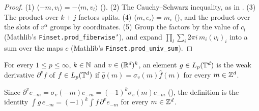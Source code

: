 \begin{proof}
\leanok
(1) $\langle -m, v_l \rangle = -\langle m, v_l \rangle$ (). (2) The
Cauchy--Schwarz inequality, as in . (3) The product over $k + j$
factors splits. (4) $\langle m, e_i \rangle = m_i$ (), and the product over
the slots of $v^\alpha$ groups by coordinates. (5) Group the factors by the value of $c_l$
(Mathlib's \texttt{Finset.\allowbreak prod\_\allowbreak fiberwise'}), and expand
$\prod_l \sum_i 2\pi i \, m_i (v_l)_i$ into a sum over the maps $c$ (Mathlib's
\texttt{Finset.\allowbreak prod\_\allowbreak univ\_\allowbreak sum}).
\end{proof}

\begin{definition}
\label{def:torus-weak-line-derivative}
\leanok
{}
For every $1 \leq p \leq \infty$, $k \in \mathbb{N}$ and $v \in (\mathbb{R}^d)^k$, an element $g \in L_p(\mathbb{T}^d)$
is the weak derivative $\partial^v f$ of $f \in L_p(\mathbb{T}^d)$ if $\hat g(m) = \sigma_v(m) \hat f(m)$
for every $m \in \mathbb{Z}^d$.
\end{definition}

Since $\partial^v e_{-m} = \sigma_v(-m) e_{-m} = (-1)^k \sigma_v(m) e_{-m}$
(), the definition is the identity
$\int g \, e_{-m} = (-1)^k \int f \, \partial^v e_{-m}$ for every $m \in \mathbb{Z}^d$.


